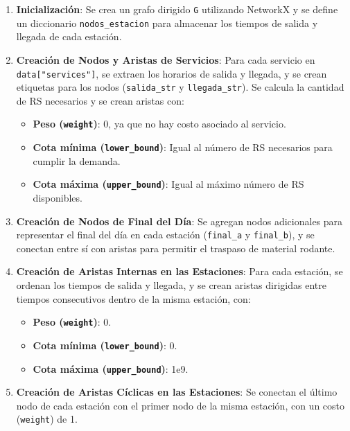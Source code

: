 \documentclass{article}
\begin{document}
\begin{enumerate}
    \item \textbf{Inicialización}: 
    Se crea un grafo dirigido \texttt{G} utilizando NetworkX y se define un diccionario \texttt{nodos\_estacion} para almacenar los tiempos de salida y llegada de cada estación.

    \item \textbf{Creación de Nodos y Aristas de Servicios}:
    Para cada servicio en \texttt{data["services"]}, se extraen los horarios de salida y llegada, y se crean etiquetas para los nodos (\texttt{salida\_str} y \texttt{llegada\_str}). Se calcula la cantidad de RS necesarios y se crean aristas con:
    \begin{itemize}
        \item \textbf{Peso (\texttt{weight})}: 0, ya que no hay costo asociado al servicio.
        \item \textbf{Cota mínima (\texttt{lower\_bound})}: Igual al número de RS necesarios para cumplir la demanda.
        \item \textbf{Cota máxima (\texttt{upper\_bound})}: Igual al máximo número de RS disponibles.
    \end{itemize}

    \item \textbf{Creación de Nodos de Final del Día}:
    Se agregan nodos adicionales para representar el final del día en cada estación (\texttt{final\_a} y \texttt{final\_b}), y se conectan entre sí con aristas para permitir el traspaso de material rodante.

    \item \textbf{Creación de Aristas Internas en las Estaciones}:
    Para cada estación, se ordenan los tiempos de salida y llegada, y se crean aristas dirigidas entre tiempos consecutivos dentro de la misma estación, con:
    \begin{itemize}
        \item \textbf{Peso (\texttt{weight})}: 0.
        \item \textbf{Cota mínima (\texttt{lower\_bound})}: 0.
        \item \textbf{Cota máxima (\texttt{upper\_bound})}: 1e9.
    \end{itemize}

    \item \textbf{Creación de Aristas Cíclicas en las Estaciones}:
    Se conectan el último nodo de cada estación con el primer nodo de la misma estación, con un costo (\texttt{weight}) de 1.

\end{enumerate}
\end{document}
